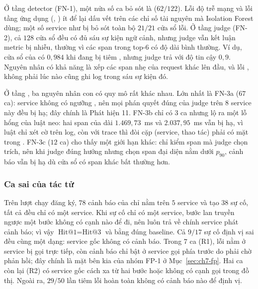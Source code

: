 Ở tầng detector (FN-1), một nửa số ca bỏ sót là  ($62/122$). Lỗi độ trễ mạng và lỗi tầng ứng dụng (, ) ít để lại dấu vết trên các chỉ số tài nguyên mà Isolation Forest dùng; một số service như  bị bỏ sót toàn bộ $21/21$ cửa sổ lỗi. Ở tầng judge (FN-2), cả $128$ cửa sổ đều có đủ sáu sự kiện ngữ cảnh, nhưng judge vẫn kết luận metric bị nhiễu, thường vì các span  trong top-6 có độ dài bình thường. Ví dụ, cửa sổ  của  có  $0{,}984$ khi đang bị tiêm , nhưng judge trả  với độ tin cậy $0{,}9$. Nguyên nhân có khả năng là  xếp các span nhẹ của request khác lên đầu, và lỗi ,  không phải lúc nào cũng ghi log  trong sáu sự kiện đó.

Ở tầng , ba nguyên nhân con có quy mô rất khác nhau. Lớn nhất là FN-3a ($67$ ca): service không có ngưỡng , nên mọi phán quyết đúng của judge trên $8$ service này đều bị hạ; đây chính là Phát hiện 11. FN-3b chỉ có $3$ ca nhưng lộ ra một lỗ hổng của luật neo: hai span  của  dài $1.469{,}73$~ms và $2.037{,}95$~ms vẫn bị hạ, vì luật  chỉ xét cờ  trên log, còn với trace thì đòi cặp (service, thao tác) phải có mặt trong . FN-3c ($12$ ca) cho thấy một giới hạn khác:  chỉ kiểm span mà judge chọn trích, nên khi judge đúng hướng nhưng chọn span đại diện nằm dưới $p_{90}$, cảnh báo vẫn bị hạ dù cửa sổ có span khác bất thường hơn.

\subsubsection{Ca sai của tác tử }
\label{sec:ch7-rca-sai}

Trên lượt chạy đăng ký, $78$ cảnh báo của \CTAV{} chỉ nằm trên $5$ service và tạo $38$ sự cố, tất cả đều chỉ có một service. Khi sự cố chỉ có một service, bước lan truyền ngược một bước không có cạnh nào để đi, nên luôn trả về chính service phát cảnh báo; vì vậy $\text{Hit@1} = \text{Hit@3}$ và bằng đúng baseline. Cả $9/17$ sự cố định vị sai đều cùng một dạng: service gốc không có cảnh báo. Trong $7$ ca (R1), lỗi nằm ở service bị gọi trực tiếp, còn cảnh báo chỉ bật ở service gọi phía trước do phải chờ phản hồi; đây chính là mặt bên kia của nhóm FP-1 ở Mục~\ref{sec:ch7-fp}. Hai ca còn lại (R2) có service gốc cách xa từ hai bước hoặc không có cạnh gọi trong đồ thị. Ngoài ra, $29/50$ lần tiêm lỗi hoàn toàn không có cảnh báo nào để định vị. %

